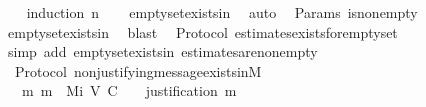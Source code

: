 \begin{isabellebody}
%
\isadelimproof
\ \ %
\endisadelimproof
%
\isatagproof
{}\isamarkupfalse%
\ {\isacharparenleft}induction\ n{\isacharparenright}\isanewline
\ \ \isamarkupfalse%
\ empty{\isacharunderscore}set{\isacharunderscore}exists{\isacharunderscore}in{\isacharunderscore}{\isasymSigma}{\isacharunderscore}{}\ \isamarkupfalse%
\ auto%
\endisatagproof
{\isafoldproof}%
%
\isadelimproof
\isanewline
%
\endisadelimproof
\isanewline
{}\isamarkupfalse%
\ {\isacharparenleft}\ Params{\isacharparenright}\ {\isasymSigma}{\isacharunderscore}is{\isacharunderscore}non{\isacharunderscore}empty{\isacharcolon}\ {\isachardoublequoteopen}{\isasymSigma}\ {\isasymnoteq}\ {\isasymemptyset}{\isachardoublequoteclose}\isanewline
%
\isadelimproof
\ \ %
\endisadelimproof
%
\isatagproof
{}\isamarkupfalse%
\ empty{\isacharunderscore}set{\isacharunderscore}exists{\isacharunderscore}in{\isacharunderscore}{\isasymSigma}\ \isamarkupfalse%
\ blast%
\endisatagproof
{\isafoldproof}%
%
\isadelimproof
\isanewline
%
\endisadelimproof
\isanewline
{}\isamarkupfalse%
\ {\isacharparenleft}\ Protocol{\isacharparenright}\ estimates{\isacharunderscore}exists{\isacharunderscore}for{\isacharunderscore}empty{\isacharunderscore}set\ {\isacharcolon}\isanewline
\ \ {\isachardoublequoteopen}{\isasymepsilon}\ {\isasymemptyset}\ {\isasymnoteq}\ {\isasymemptyset}{\isachardoublequoteclose}\isanewline
%
\isadelimproof
\ \ %
\endisadelimproof
%
\isatagproof
{}\isamarkupfalse%
\ {\isacharparenleft}simp\ add{\isacharcolon}\ empty{\isacharunderscore}set{\isacharunderscore}exists{\isacharunderscore}in{\isacharunderscore}{\isasymSigma}\ estimates{\isacharunderscore}are{\isacharunderscore}non{\isacharunderscore}empty{\isacharparenright}%
\endisatagproof
{\isafoldproof}%
%
\isadelimproof
\isanewline
%
\endisadelimproof
\isanewline
{}\isamarkupfalse%
\ {\isacharparenleft}\ Protocol{\isacharparenright}\ non{\isacharunderscore}justifying{\isacharunderscore}message{\isacharunderscore}exists{\isacharunderscore}in{\isacharunderscore}M{\isacharunderscore}{}{\isacharcolon}\ \isanewline
\ \ {\isachardoublequoteopen}{\isasymexists}\ m{\isachardot}\ m\ {\isasymin}\ M{\isacharunderscore}i\ {\isacharparenleft}V{\isacharcomma}\ C{\isacharcomma}\ {\isasymepsilon}{\isacharparenright}\ {}\ {\isasymand}\ justification\ m\ {\isacharequal}\ {\isasymemptyset}{\isachardoublequoteclose}\ \isanewline
%
\isadelimproof
\ \ %
\endisadelimproof

\end{isabellebody}
